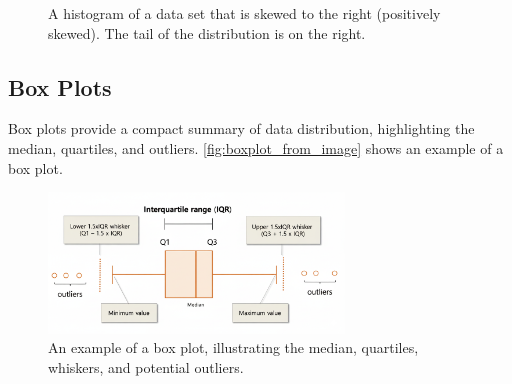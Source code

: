\begin{figure}[htbp]
    \centering
    \caption{A histogram of a data set that is skewed to the right (positively skewed). The tail of the distribution is on the right.}
    \label{fig:right_skewed_hist}
\end{figure}


\subsection*{Box Plots}

Box plots provide a compact summary of data distribution, highlighting the median, quartiles, and outliers. \autoref{fig:boxplot_from_image} shows an example of a box plot.

\begin{figure}[h!]
    \centering
    \includegraphics[width=0.7\textwidth]{figure/boxplot.png}
    \caption{An example of a box plot, illustrating the median, quartiles, whiskers, and potential outliers.}
    \label{fig:boxplot_from_image}
\end{figure}



